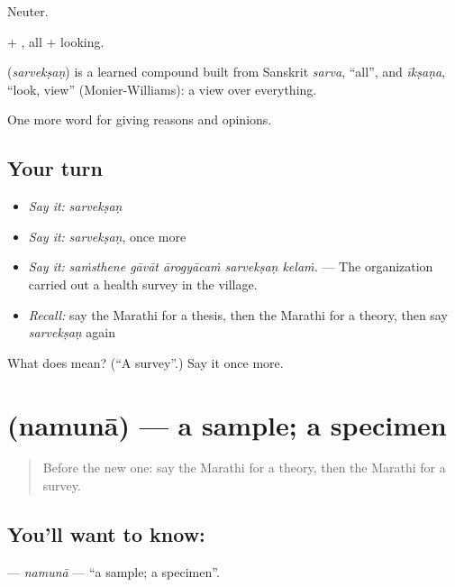 Neuter.

 + , all + looking.

\begin{cousinweb}
\textbf{} (\emph{sarvekṣaṇ}) is a learned compound built from Sanskrit \emph{sarva}, \textquotedblleft{}all\textquotedblright{}, and \emph{īkṣaṇa}, \textquotedblleft{}look, view\textquotedblright{} (Monier-Williams): a view over everything.
\end{cousinweb}

\begin{grammarlens}[title={What you've built}]
One more word for giving reasons and opinions.
\end{grammarlens}

\subsection*{Your turn}
\begin{itemize}
\raggedright
  \item \emph{Say it:} \emph{sarvekṣaṇ}
  \item \emph{Say it:} \emph{sarvekṣaṇ}, once more
  \item \emph{Say it:} \emph{saṁsthene gāvāt ārogyācaṁ sarvekṣaṇ kelaṁ.} — The organization carried out a health survey in the village.
  \item \emph{Recall:} say the Marathi for a thesis, then the Marathi for a theory, then say \emph{sarvekṣaṇ} again
\end{itemize}

\begin{tcolorbox}[breakable,colback=teal!4,colframe=teal!35!black,title={Before you move on}]
What does  mean? (\textquotedblleft{}A survey\textquotedblright{}.) Say it once more.
\end{tcolorbox}
\section[\texorpdfstring{\mr{नमुना} (namunā)}{नमुना (namunā)}]{ (namunā) — a sample; a specimen}

\label{lesson:MR-C373-namuna}



\begin{quote}
Before the new one: say the Marathi for a theory, then the Marathi for a survey.
\end{quote}

\subsection*{You'll want to know: }
\textbf{} — \emph{namunā} — \textquotedblleft{}a sample; a specimen\textquotedblright{}.

